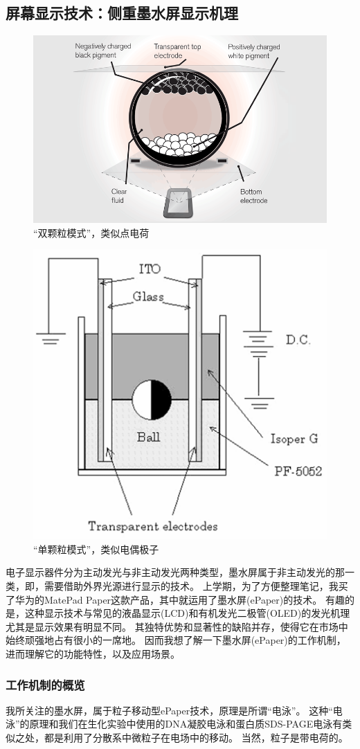 \documentclass[UTF-8]{ctexart}
\begin{document}
\subsection{屏幕显示技术：侧重墨水屏显示机理}
\begin{figure}
    \centering
    \includegraphics[width=0.4\linewidth]{../Figures/epaper-single ball.png}
    \caption{“双颗粒模式”，类似点电荷\cite{ePaper-web}}
    \label{双颗粒}
\end{figure}
\begin{figure}
    \centering
    \includegraphics[width=0.4\linewidth]{../Figures/epaper-dipole.png}
    \caption{“单颗粒模式”，类似电偶极子\cite{ball}}
    \label{单颗粒}
\end{figure}
电子显示器件分为主动发光与非主动发光两种类型，墨水屏属于非主动发光的那一类，即，需要借助外界光源进行显示的技术\cite{tablet}。
上学期，为了方便整理笔记，我买了华为的MatePad Paper这款产品，其中就运用了墨水屏(ePaper)的技术。
有趣的是，这种显示技术与常见的液晶显示(LCD)和有机发光二极管(OLED)的发光机理尤其是显示效果有明显不同。
其独特优势和显著性的缺陷并存，使得它在市场中始终顽强地占有很小的一席地。
因而我想了解一下墨水屏(ePaper)的工作机制，进而理解它的功能特性，以及应用场景。

\subsubsection{工作机制的概览}
我所关注的墨水屏，属于粒子移动型ePaper技术\cite{tablet}，原理是所谓“电泳”。
这种“电泳”的原理和我们在生化实验中使用的DNA凝胶电泳和蛋白质SDS-PAGE电泳有类似之处，都是利用了分散系中微粒子在电场中的移动。
当然，粒子是带电荷的。
\end{document}

